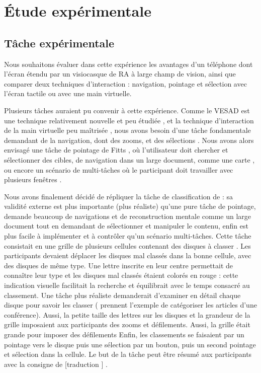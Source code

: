 \chapter{Étude expérimentale}
\label{ch:experiment}

\section{Tâche expérimentale}
\label{sec:experiment_task}

Nous souhaitons évaluer dans cette expérience les avantages d'un téléphone dont l'écran étendu par un visiocasque de RA à large champ de vision, ainsi que comparer deux techniques d'interaction : navigation, pointage et sélection avec l'écran tactile ou avec une main virtuelle.

Plusieurs tâches auraient pu convenir à cette expérience. Comme le VESAD est une technique relativement nouvelle et peu étudiée \citep{Grubert2015}, et la technique d'interaction de la main virtuelle peu maîtrisée \citep{Argelaguet2013, Piumsomboon2013}, nous avons besoin d'une tâche fondamentale demandant de la navigation, dont des zooms, et des sélections \citep{Bowman2004}. Nous avons alors envisagé une tâche de pointage de Fitts \citep{Soukoreff2004, Berge2014}, où l'utilisateur doit chercher et sélectionner des cibles, de navigation dans un large document, comme une carte \citep{Baudisch2002, Raedle2014}, ou encore un scénario de multi-tâches où le participant doit travailler avec plusieurs fenêtres \citep{Czerwinski2003, Ens2014}.

Nous avons finalement décidé de répliquer la tâche de classification de \cite{Liu2014} : sa validité externe est plus importante (plus réaliste) qu'une pure tâche de pointage, demande beaucoup de navigations et de reconstruction mentale comme un large document tout en demandant de sélectionner et manipuler le contenu, enfin est plus facile à implémenter et à contrôler qu'un scénario multi-tâches. Cette tâche consistait en une grille de plusieurs cellules contenant des disques à classer . Les participants devaient déplacer les disques mal classés dans la bonne cellule, avec des disques de même type. Une lettre inscrite en leur centre permettait de connaître leur type et les disques mal classés étaient colorés en rouge : cette indication visuelle facilitait la recherche et équilibrait avec le temps consacré au classement. Une tâche plus réaliste demanderait d'examiner en détail chaque disque pour savoir les classer (\citeauthor{Liu2014} prennent l'exemple de catégoriser les articles d'une conférence). Aussi, la petite taille des lettres sur les disques et la grandeur de la grille imposaient aux participants des zooms et défilements. Aussi, la grille était grande pour imposer des défilements Enfin, les classements se faisaient par un pointage vers le disque puis une sélection par un bouton, puis un second pointage et sélection dans la cellule. Le but de la tâche peut être résumé aux participants avec la consigne de [traduction ] \citep{Liu2014}.

